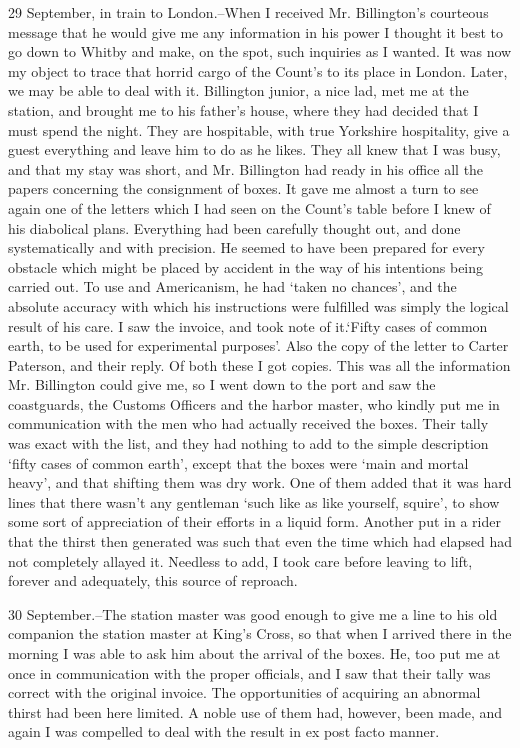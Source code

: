 29 September, in train to London.--When I received Mr. Billington's courteous message that he would give me any information in his power I thought it best to go down to Whitby and make, on the spot, such inquiries as I wanted. It was now my object to trace that horrid cargo of the Count's to its place in London. Later, we may be able to deal with it. Billington junior, a nice lad, met me at the station, and brought me to his father's house, where they had decided that I must spend the night. They are hospitable, with true Yorkshire hospitality, give a guest everything and leave him to do as he likes. They all knew that I was busy, and that my stay was short, and Mr. Billington had ready in his office all the papers concerning the consignment of boxes. It gave me almost a turn to see again one of the letters which I had seen on the Count's table before I knew of his diabolical plans. Everything had been carefully thought out, and done systematically and with precision. He seemed to have been prepared for every obstacle which might be placed by accident in the way of his intentions being carried out. To use and Americanism, he had `taken no chances', and the absolute accuracy with which his instructions were fulfilled was simply the logical result of his care. I saw the invoice, and took note of it.`Fifty cases of common earth, to be used for experimental purposes'. Also the copy of the letter to Carter Paterson, and their reply. Of both these I got copies. This was all the information Mr. Billington could give me, so I went down to the port and saw the coastguards, the Customs Officers and the harbor master, who kindly put me in communication with the men who had actually received the boxes. Their tally was exact with the list, and they had nothing to add to the simple description `fifty cases of common earth', except that the boxes were `main and mortal heavy', and that shifting them was dry work. One of them added that it was hard lines that there wasn't any gentleman `such like as like yourself, squire', to show some sort of appreciation of their efforts in a liquid form. Another put in a rider that the thirst then generated was such that even the time which had elapsed had not completely allayed it. Needless to add, I took care before leaving to lift, forever and adequately, this source of reproach. 

30 September.--The station master was good enough to give me a line to his old companion the station master at King's Cross, so that when I arrived there in the morning I was able to ask him about the arrival of the boxes. He, too put me at once in communication with the proper officials, and I saw that their tally was correct with the original invoice. The opportunities of acquiring an abnormal thirst had been here limited. A noble use of them had, however, been made, and again I was compelled to deal with the result in ex post facto manner. 


